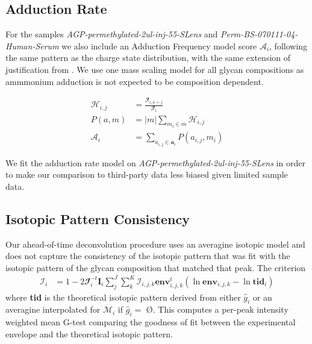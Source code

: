 \documentclass{article}
\begin{document}
    \subsection{Adduction Rate}
        For the samples \textit{AGP-permethylated-2ul-inj-55-SLens} and \textit{Perm-BS-070111-04-Human-Serum}
        we also include an Adduction Frequency model score $\mathscr{A}_i$, following the same
        pattern as the charge state distribution, with the same extension of justification
        from \cite{Maxwell2012}. We use one mass scaling model for all glycan compositions
        as ammmonium adduction is not expected to be composition dependent.

        \begin{align}
            \mathcal{H}_{i,j} &= \frac{
                \mathbfcal{I}_{i, a=j}}{\mathbfcal{I}_i} \nonumber\\
            P(a, m) &= |m|\sum_{m_i \in m} \mathcal{H}_{i, j} \nonumber\\
            \mathscr{A}_i &= \sum_{a_{i, j} \in \mathbf{a}_i}{P(a_{i, j}, m_i)}
        \end{align}

        We fit the adduction rate model on \textit{AGP-permethylated-2ul-inj-55-SLens} in order
        to make our comparison to third-party data less biased given limited sample data.

    \subsection{Isotopic Pattern Consistency}
        Our ahead-of-time deconvolution procedure uses an averagine isotopic model and does not
        capture the consistency of the isotopic pattern that was fit with the isotopic pattern
        of the glycan composition that matched that peak. The criterion
        \begin{align}
            \mathscr{I}_i &= 1 - 2\mathbfcal{I}_i^{-t}\mathbf{I}_i\sum_j^J{
                \sum_k^K{\mathcal{I}_{i, j, k}
                    \textbf{env}_{i, j, k}^t\left(
                        \ln{\textbf{env}}_{i, j, k} -
                        \ln{\textbf{tid}_{i}}
                    \right)
                }
            }
        \end{align}
        \noindent where \textbf{tid} is the theoretical isotopic pattern derived from either ${\hat g}_i$
        or an averagine interpolated for $\mathcal{M}_i$ if ${\hat g}_i =$ \O. This computes a
        per-peak intensity weighted mean G-test comparing the goodness of fit between the experimental
        envelope and the theoretical isotopic pattern.
\end{document}
